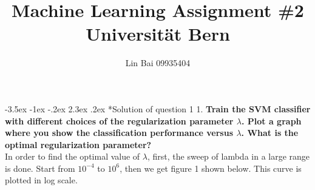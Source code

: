 \documentclass[12pt]{article}
\makeatletter
\renewcommand\section{\@startsection {section}{1}{\z@}%
	{-3.5ex \@plus -1ex \@minus -.2ex}%
	{2.3ex \@plus.2ex}%
	{\normalfont\large\bfseries}}%
\makeatother
\begin{document}
	
	
	
	\title{\textbf{Machine Learning Assignment \#2}\\
	Universit{\"a}t Bern}%
	\author{Lin Bai 09935404} %
	
	\maketitle
	

	\section*{Solution of question 1}
	1. \textbf{Train the SVM classifier with different choices of the regularization parameter $\lambda$. Plot a graph where you show the classification performance versus $\lambda$. What is the optimal regularization parameter?}\\
	\noindent
	In order to find the optimal value of $\lambda$, first, the sweep of lambda in a large range is done. Start from $10^{-4}$ to $10^6$, then we get figure 1 shown below. This curve is plotted in log scale.\\
	
\end{document}

